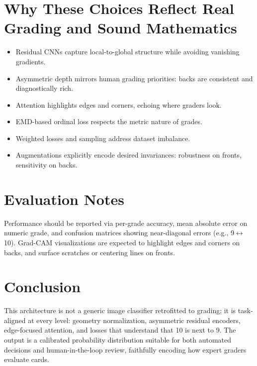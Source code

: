 \documentclass[12pt]{article}
\begin{document}
\section{Why These Choices Reflect Real Grading and Sound Mathematics}
\begin{itemize}
    \item Residual CNNs capture local-to-global structure while avoiding vanishing gradients.
    \item Asymmetric depth mirrors human grading priorities: backs are consistent and diagnostically rich.
    \item Attention highlights edges and corners, echoing where graders look.
    \item EMD-based ordinal loss respects the metric nature of grades.
    \item Weighted losses and sampling address dataset imbalance.
    \item Augmentations explicitly encode desired invariances: robustness on fronts, sensitivity on backs.
\end{itemize}

\section{Evaluation Notes}
Performance should be reported via per-grade accuracy, mean absolute error on numeric grade, and confusion matrices showing near-diagonal errors (e.g., 9$\leftrightarrow$10). 
Grad-CAM visualizations are expected to highlight edges and corners on backs, and surface scratches or centering lines on fronts.

\section{Conclusion}
This architecture is not a generic image classifier retrofitted to grading; it is task-aligned at every level: geometry normalization, asymmetric residual encoders, edge-focused attention, and losses that understand that 10 is next to 9. 
The output is a calibrated probability distribution suitable for both automated decisions and human-in-the-loop review, faithfully encoding how expert graders evaluate cards.
\end{document}

